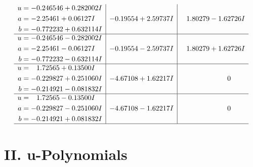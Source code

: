 \documentclass[1p]{elsarticle_modified}
\theoremstyle{definition}
\begin{document}
$$\begin{array}{c|c|c}
\begin{aligned}
u &= -0.246546 + 0.282002 I \\
a &= -2.25461 + 0.06127 I \\
b &= -0.772232 + 0.632114 I\end{aligned}
 & -0.19554 + 2.59737 I & \phantom{-}1.80279 - 1.62726 I \\ \hline\begin{aligned}
u &= -0.246546 - 0.282002 I \\
a &= -2.25461 - 0.06127 I \\
b &= -0.772232 - 0.632114 I\end{aligned}
 & -0.19554 - 2.59737 I & \phantom{-}1.80279 + 1.62726 I \\ \hline\begin{aligned}
u &= \phantom{-}1.72565 + 0.13500 I \\
a &= -0.229827 + 0.251060 I \\
b &= -0.214921 - 0.081832 I\end{aligned}
 & -4.67108 + 1.62217 I & \phantom{-0.000000 } 0 \\ \hline\begin{aligned}
u &= \phantom{-}1.72565 - 0.13500 I \\
a &= -0.229827 - 0.251060 I \\
b &= -0.214921 + 0.081832 I\end{aligned}
 & -4.67108 - 1.62217 I & \phantom{-0.000000 } 0\\
 \hline 
 \end{array}$$\newpage
\newpage\renewcommand{\arraystretch}{1}
\centering \section*{ II. u-Polynomials}
\end{document}
